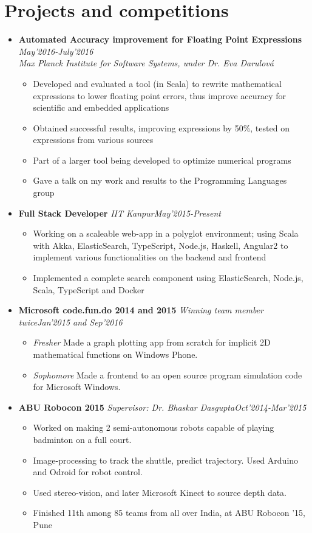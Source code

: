 \documentclass[11pt,a4paper]{moderncv}
\newcommand{\experience}[4]{
  \vspace{0.1cm}
\item \textbf{\large{#1}} \textit{#2}\hfill\textit{#3}
  \begin{itemize}[leftmargin=*]
    \setlength\itemsep{0em} #4
  \end{itemize}
}
\newcommand{\experiencetwo}[4]{
  \vspace{0.1cm}
\item \textbf{\large{#1}} \hfill\textit{#3}\\\textit{#2}
  \begin{itemize}[leftmargin=*]
    \setlength\itemsep{0em} #4
  \end{itemize}
}
\begin{document}
\vspace{-0.1cm}
\section*{Projects and competitions}
\begin{itemize}
  \setlength\itemsep{0.5em}
  \experiencetwo{Automated Accuracy improvement for Floating Point Expressions}{Max Planck Institute for Software
    Systems, under Dr. Eva Darulová}{May'2016-July'2016}{
    \item Developed and evaluated a tool (in Scala) to rewrite
      mathematical expressions to lower floating point errors, thus
      improve accuracy for scientific and embedded applications
    \item Obtained successful results, improving expressions by 50\%,
      tested on expressions from various sources
    \item Part of a larger tool being developed to optimize numerical
      programs
    \item Gave a talk on my work and results to the Programming Languages group
  }

  \experience{Full Stack Developer}{IIT Kanpur}{May'2015-Present}{
  \item Working on a scaleable web-app in a polyglot environment;
    using Scala with Akka, ElasticSearch, TypeScript, Node.js,
    Haskell, Angular2 to implement various functionalities on the
    backend and frontend
  \item Implemented a complete search component using
    ElasticSearch, Node.js, Scala, TypeScript and Docker
  }

  \experience{Microsoft code.fun.do 2014 and 2015}{Winning team member twice}{Jan'2015 and Sep'2016}{
  \item \textit{Fresher} Made a graph plotting app from scratch for implicit 2D mathematical functions on Windows Phone.
  \item \textit{Sophomore} Made a frontend to an open source program simulation code for Microsoft Windows.
  }

  \experience{ABU Robocon 2015}{Supervisor: Dr. Bhaskar Dasgupta}{Oct'2014-Mar'2015}{
  \item Worked on making 2 semi-autonomous robots capable of playing badminton on a full court.
  \item Image-processing to track the shuttle, predict trajectory. Used Arduino and Odroid for robot control.
  \item Used stereo-vision, and later Microsoft Kinect to source depth
    data.
  \item Finished 11th among 85 teams from all over India, at ABU Robocon
    '15, Pune
  }


\end{itemize}
\end{document}
